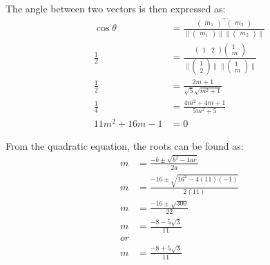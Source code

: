 \documentclass[10pt]{article}
\newcommand{\myvec}[1]{\ensuremath{\begin{pmatrix}#1\end{pmatrix}}}
\begin{document}
The angle between two vectors is then expressed as:
\begin{align}
\cos \theta &= \frac{\myvec{m_1}^\top \myvec{m_2}}{\|\myvec{m_1}\|\|\myvec{m_2}\|} \\
\frac{1}{2} &= \frac{\begin{pmatrix} 1 & 2 \end{pmatrix} \begin{pmatrix} 1 \\ m \end{pmatrix}}{\|\begin{pmatrix} 1 \\ 2 \end{pmatrix}\|\|\begin{pmatrix} 1 \\ m \end{pmatrix}\|} \\
\frac{1}{2} &= \frac{2m + 1}{\sqrt{5} \sqrt{m^2 + 1}} \\
\frac{1}{4} &= \frac{4m^2 + 4m + 1}{5m^2 + 5} \\
11m^2 + 16m - 1 &= 0
\end{align}

From the quadratic equation, the roots can be found as:
\begin{align}
m &= \frac{-b \pm \sqrt{b^2 - 4ac}}{2a} \\
m &= \frac{-16 \pm \sqrt{16^2 - 4(11)(-1)}}{2(11)} \\
m &= \frac{-16 \pm \sqrt{300}}{22} \\
m &= \frac{-8 - 5\sqrt{3}}{11} \\
or\\ 
m &= \frac{-8 + 5\sqrt{3}}{11} 
\end{align}
\end{document}
